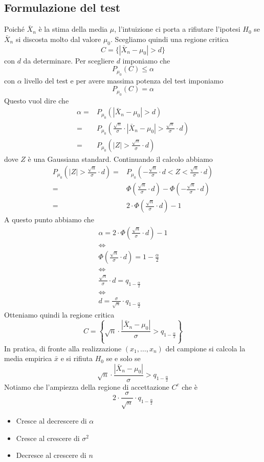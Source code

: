 \subsection{Formulazione del test}
Poiché $\bar{X}_n$ è la stima della media $\mu$, l'intuizione ci porta a rifiutare l'ipotesi $H_0$
se $\bar{X}_n$ si discosta molto dal valore $\mu_0$. Scegliamo quindi una regione critica
\[ C = \{ | \bar{X}_n - \mu_0 | > d \} \]
con $d$ da determinare. Per scegliere $d$ imponiamo che
\[ P_{\mu_0} (C) \leq \alpha \]
con $\alpha$ livello del test e per avere massima potenza del test imponiamo
\[ P_{\mu_0} (C) = \alpha \]
Questo vuol dire che
\begin{align*}
	\alpha = & P_{\mu_0} ( | \bar{X}_n - \mu_0 | > d )                        \\
	=        & P_{\mu_0} \left( \frac{\sqrt{n}}{\sigma} \cdot
	|\bar{X}_n - \mu_0| > \frac{\sqrt{n}}{\sigma} \cdot d \right)             \\
	=        & P_{\mu_0} \left( |Z| > \frac{\sqrt{n}}{\sigma} \cdot d \right)
\end{align*}
dove $Z$ è una Gaussiana standard. Continuando il calcolo abbiamo
\begin{align*}
	P_{\mu_0} \left( |Z| > \frac{\sqrt{n}}{\sigma} \cdot d \right)
	= & P_{\mu_0} \left( -\frac{\sqrt{n}}{\sigma} \cdot d < Z
	< \frac{\sqrt{n}}{\sigma} \cdot d \right)                           \\
	= & \Phi \left( \frac{\sqrt{n}}{\sigma} \cdot d \right) -
	\Phi \left( -\frac{\sqrt{n}}{\sigma} \cdot d \right)                \\
	= & 2 \cdot \Phi \left( \frac{\sqrt{n}}{\sigma} \cdot d \right) - 1
\end{align*}
A questo punto abbiamo che
\begin{gather*}
	\alpha = 2 \cdot \Phi \left( \frac{\sqrt{n}}{\sigma} \cdot d \right) - 1 \\
	\iff \\
	\Phi \left( \frac{\sqrt{n}}{\sigma} \cdot d \right) = 1 - \frac{\alpha}{2} \\
	\iff \\
	\frac{\sqrt{n}}{\sigma} \cdot d = q_{1 - \frac{\alpha}{2}} \\
	\iff \\
	d = \frac{\sigma}{\sqrt{n}} \cdot q_{1 - \frac{\alpha}{2}}
\end{gather*}
Otteniamo quindi la regione critica
\[
	C = \left\{ \sqrt{n} \cdot \frac{|\bar{X}_n -
		\mu_0|}{\sigma} > q_{1 - \frac{\alpha}{2}} \right\}
\]
In pratica, di fronte alla realizzazione $(x_1, \dots, x_n)$ del campione si calcola la media
empirica $\bar{x}$ e si rifiuta $H_0$ se e solo se
\[ \sqrt{n} \cdot \frac{|\bar{X}_n - \mu_0|}{\sigma} > q_{1 - \frac{\alpha}{2}}  \]
Notiamo che l'ampiezza della regione di accettazione $C^c$ che è
\[ 2 \cdot \frac{\sigma}{\sqrt{n}} \cdot q_{1 - \frac{\alpha}{2}} \]
\begin{itemize}
	\item Cresce al decrescere di $\alpha$
	\item Cresce al crescere di $\sigma^2$
	\item Decresce al crescere di $n$
\end{itemize}

